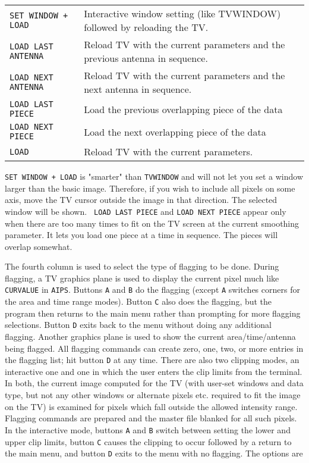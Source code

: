 \documentclass[twoside]{article}
\begin{document}
\begin{center}
\begin{tabular}{|l|l|}
{\tt SET WINDOW + LOAD  } & Interactive window setting (like TVWINDOW)
                         followed by reloading the TV.\\
{\tt LOAD LAST ANTENNA  } & Reload TV with the current parameters and the
                         previous antenna in sequence.\\
{\tt LOAD NEXT ANTENNA  } & Reload TV with the current parameters and the
                         next antenna in sequence.\\
{\tt LOAD LAST PIECE    } & Load the previous overlapping piece of the
                         data\\
{\tt LOAD NEXT PIECE    } & Load the next overlapping piece of the data\\
{\tt LOAD               } & Reload TV with the current parameters.\\ \hline
\end{tabular}
\end{center}
{\tt SET WINDOW + LOAD} is "smarter" than {\tt TVWINDOW} and will not
let you set a window larger than the basic image.  Therefore, if you
wish to include all pixels on some axis, move the TV cursor outside
the image in that direction.  The selected window will be shown.  {\tt
  LOAD LAST PIECE} and {\tt LOAD NEXT PIECE} appear only when there
are too many times to fit on the TV screen at the current smoothing
parameter.  It lets you load one piece at a time in sequence.  The
pieces will overlap somewhat.

The fourth column is used to select the type of flagging to be done.
During flagging, a TV graphics plane is used to display the current
pixel much like {\tt CURVALUE} in {\tt AIPS}\@.  Buttons {\tt A} and
{\tt B} do the flagging (except {\tt A} switches corners for the area
and time range modes).  Button {\tt C} also does the flagging, but the
program then returns to the main menu rather than prompting for more
flagging selections.  Button {\tt D} exits back to the menu without
doing any additional flagging.  Another graphics plane is used to show
the current area/time/antenna being flagged.  All flagging commands
can create zero, one, two, or more entries in the flagging list; hit
button {\tt D} at any time.  There are also two clipping modes, an
interactive one and one in which the user enters the clip limits from
the terminal.  In both, the current image computed for the TV (with
user-set windows and data type, but not any other windows or alternate
pixels etc. required to fit the image on the TV) is examined for
pixels which fall outside the allowed intensity range.  Flagging
commands are prepared and the master file blanked for all such pixels.
In the interactive mode, buttons {\tt A} and {\tt B} switch between
setting the lower and upper clip limits, button {\tt C} causes the
clipping to occur followed by a return to the main menu, and button
{\tt D} exits to the menu with no flagging.  The options are
\vfill\eject
\end{document}
